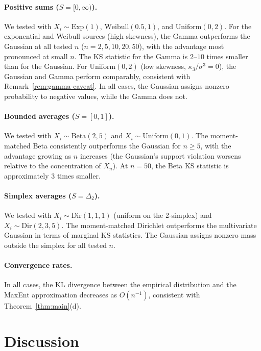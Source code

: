 \documentclass[aps,pre,twocolumn,superscriptaddress,nofootinbib]{revtex4-2}
\theoremstyle{definition}
\theoremstyle{remark}
\begin{document}
\paragraph{Positive sums ($S=[0,\infty)$).}
We tested with $X_i\sim\mathrm{Exp}(1)$, $\mathrm{Weibull}(0.5,1)$, and
$\mathrm{Uniform}(0,2)$.  For the exponential and Weibull sources (high
skewness), the Gamma outperforms the Gaussian at all tested $n$ ($n=2,5,10,20,50$),
with the advantage most pronounced at small $n$.  The KS statistic for
the Gamma is $2$--$10$ times smaller than for the Gaussian.
For $\mathrm{Uniform}(0,2)$ (low skewness, $\kappa_3/\sigma^3=0$), the
Gaussian and Gamma perform comparably, consistent with Remark~\ref{rem:gamma-caveat}.
In all cases, the Gaussian assigns nonzero probability to negative values,
while the Gamma does not.

\paragraph{Bounded averages ($S=[0,1]$).}
We tested with $X_i\sim\mathrm{Beta}(2,5)$ and
$X_i\sim\mathrm{Uniform}(0,1)$.  The moment-matched Beta consistently
outperforms the Gaussian for $n\ge 5$, with the advantage growing as $n$
increases (the Gaussian's support violation worsens relative to the
concentration of $\bar{X}_n$).  At $n=50$, the Beta KS statistic is
approximately $3$ times smaller.

\paragraph{Simplex averages ($S=\Delta_2$).}
We tested with $X_i\sim\mathrm{Dir}(1,1,1)$ (uniform on the 2-simplex) and
$X_i\sim\mathrm{Dir}(2,3,5)$.  The moment-matched Dirichlet outperforms the
multivariate Gaussian in terms of marginal KS statistics.  The Gaussian
assigns nonzero mass outside the simplex for all tested $n$.

\paragraph{Convergence rates.}
In all cases, the KL divergence between the empirical distribution and the
MaxEnt approximation decreases as $O(n^{-1})$, consistent with
Theorem~\ref{thm:main}(d).

\section{Discussion}\label{sec:discussion}
\end{document}
